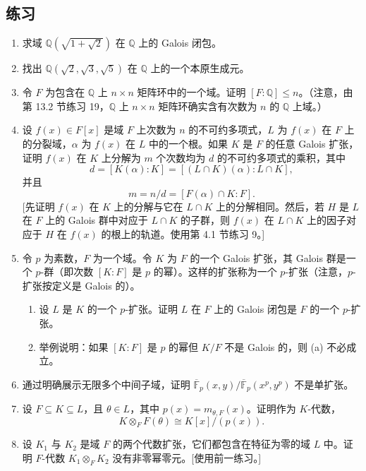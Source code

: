 \subsection*{练习}
\begin{enumerate}[label=\arabic*.]
\item 求域 $\mathbb Q(\sqrt{1+\sqrt2})$ 在 $\mathbb Q$ 上的 Galois 闭包。

\item 找出 $\mathbb Q(\sqrt2,\sqrt3,\sqrt5)$ 在 $\mathbb Q$ 上的一个本原生成元。

\item 令 $F$ 为包含在 $\mathbb Q$ 上 $n\times n$ 矩阵环中的一个域。证明 $[F:\mathbb Q]\leq n$。（注意，由第 13.2 节练习 19，$\mathbb Q$ 上 $n\times n$ 矩阵环确实含有次数为 $n$ 的 $\mathbb Q$ 上域。）

\item 设 $f(x)\in F[x]$ 是域 $F$ 上次数为 $n$ 的不可约多项式，$L$ 为 $f(x)$ 在 $F$ 上的分裂域，$\alpha$ 为 $f(x)$ 在 $L$ 中的一个根。如果 $K$ 是 $F$ 的任意 Galois 扩张，证明 $f(x)$ 在 $K$ 上分解为 $m$ 个次数均为 $d$ 的不可约多项式的乘积，其中
\[
d=[K(\alpha):K]=[(L\cap K)(\alpha):L\cap K],
\]
并且
\[
m=n/d=[F(\alpha)\cap K:F].
\]
[先证明 $f(x)$ 在 $K$ 上的分解与它在 $L\cap K$ 上的分解相同。然后，若 $H$ 是 $L$ 在 $F$ 上的 Galois 群中对应于 $L\cap K$ 的子群，则 $f(x)$ 在 $L\cap K$ 上的因子对应于 $H$ 在 $f(x)$ 的根上的轨道。使用第 4.1 节练习 9。]

\item 令 $p$ 为素数，$F$ 为一个域。令 $K$ 为 $F$ 的一个 Galois 扩张，其 Galois 群是一个 $p$-群（即次数 $[K:F]$ 是 $p$ 的幂）。这样的扩张称为一个 $p$-扩张（注意，$p$-扩张按定义是 Galois 的）。
\begin{enumerate}[label=(\alph*)]
\item 设 $L$ 是 $K$ 的一个 $p$-扩张。证明 $L$ 在 $F$ 上的 Galois 闭包是 $F$ 的一个 $p$-扩张。
\item 举例说明：如果 $[K:F]$ 是 $p$ 的幂但 $K/F$ 不是 Galois 的，则 (a) 不必成立。
\end{enumerate}

\item 通过明确展示无限多个中间子域，证明 $\overline{\mathbb F}_p(x,y)/\overline{\mathbb F}_p(x^p,y^p)$ 不是单扩张。

\item 设 $F\subseteq K\subseteq L$，且 $\theta\in L$，其中 $p(x)=m_{\theta,F}(x)$。证明作为 $K$-代数，
\[
K\otimes_F F(\theta)\cong K[x]/(p(x)).
\]

\item 设 $K_1$ 与 $K_2$ 是域 $F$ 的两个代数扩张，它们都包含在特征为零的域 $L$ 中。证明 $F$-代数 $K_1\otimes_F K_2$ 没有非零幂零元。[使用前一练习。]
\end{enumerate}


